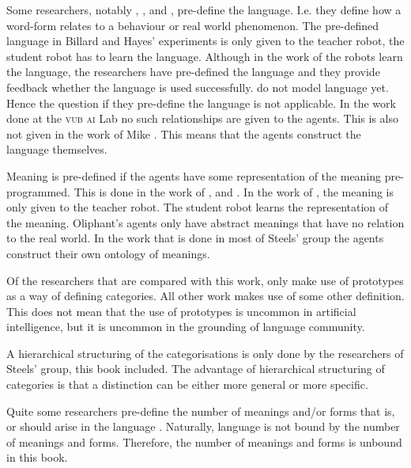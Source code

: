 Some researchers, notably \citet{billard:1997a}, \citet{cangelosiparisi:1998}, and \citet{yancostein}, pre-define the language. I.e. they define how a word-form relates to a behaviour or real world phenomenon. The pre-defined language in Billard and Hayes' experiments is only given to the teacher robot, the student robot has to learn the language. Although in the work of \citeauthor{yancostein} the robots learn the language, the researchers have pre-defined the language and they provide feedback whether the language is used successfully. \citet{rosenstein:1998a} do not model language yet. Hence the question if they pre-define the language is not applicable. In the work done at the {\scshape vub ai} Lab no such relationships are given to the agents. This is also not given in the work of Mike \citet{oliphant:1997}. This means that the agents construct the language themselves. 

Meaning is pre-defined if the agents have some representation of the meaning pre-programmed. This is done in the work of \citet{billard:1997a}, \citet{oliphant:1997} and \citet{yancostein}. In the work of \citeauthor{billard:1997a}, the meaning is only given to the teacher robot. The student robot learns the representation of the meaning. Oliphant's agents only have abstract meanings that have no relation to the real world. In the work that is done in most of Steels' group the agents construct their own ontology of meanings.

Of the researchers that are compared with this work, only \citet{rosenstein:1998a} make use of prototypes as a way of defining categories. All other work makes use of some other definition. This does not mean that the use of prototypes is uncommon in artificial intelligence, but it is uncommon in the grounding of language community.

A hierarchical structuring of the categorisations is only done by the research\-ers of Steels' group, this book included. The advantage of hierarchical structuring of categories is that a distinction can be either more general or more specific.

Quite some researchers pre-define the number of meanings and/or forms that is, or should arise in the language \citep{billard:1997a,cangelosiparisi:1998,oliphant:1997,yancostein}. Naturally, language is not bound by the number of meanings and forms. Therefore, the number of meanings and forms is unbound in this book.

